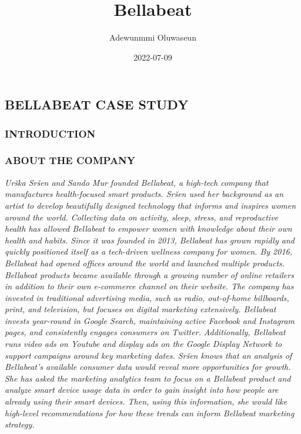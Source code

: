 \documentclass[
]{article}
\title{Bellabeat}
\author{Adewunmmi Oluwaseun}
\date{2022-07-09}
\begin{document}
\maketitle

\hypertarget{bellabeat-case-study}{%
\subsection{BELLABEAT CASE STUDY}\label{bellabeat-case-study}}

\hypertarget{introduction}{%
\subsubsection{INTRODUCTION}\label{introduction}}

\hypertarget{about-the-company}{%
\subsubsection{ABOUT THE COMPANY}\label{about-the-company}}

\emph{Urška Sršen and Sando Mur founded Bellabeat, a high-tech company
that manufactures health-focused smart products. Sršen used her
background as an artist to develop beautifully designed technology that
informs and inspires women around the world. Collecting data on
activity, sleep, stress, and reproductive health has allowed Bellabeat
to empower women with knowledge about their own health and habits. Since
it was founded in 2013, Bellabeat has grown rapidly and quickly
positioned itself as a tech-driven wellness company for women. By 2016,
Bellabeat had opened offices around the world and launched multiple
products. Bellabeat products became available through a growing number
of online retailers in addition to their own e-commerce channel on their
website. The company has invested in traditional advertising media, such
as radio, out-of-home billboards, print, and television, but focuses on
digital marketing extensively. Bellabeat invests year-round in Google
Search, maintaining active Facebook and Instagram pages, and
consistently engages consumers on Twitter. Additionally, Bellabeat runs
video ads on Youtube and display ads on the Google Display Network to
support campaigns around key marketing dates. Sršen knows that an
analysis of Bellabeat's available consumer data would reveal more
opportunities for growth. She has asked the marketing analytics team to
focus on a Bellabeat product and analyze smart device usage data in
order to gain insight into how people are already using their smart
devices. Then, using this information, she would like high-level
recommendations for how these trends can inform Bellabeat marketing
strategy.}
\end{document}
